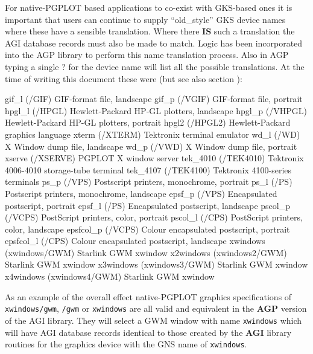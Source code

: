 \documentclass[twoside,11pt,nolof]{starlink}
\begin{document}
For native-PGPLOT based applications to co-exist with GKS-based ones
it is important that users can continue to supply ``old\_style'' GKS device
names where these have a sensible translation. Where there \textbf{IS} such
a translation the AGI  database records must also be made to match.
Logic has been incorporated into the AGP library to perform this name
translation process.
Also in AGP typing a single ? for the device name will list all the possible
translations. At the time of writing this document these were (but see also
section ):
\begin{terminalv}
gif_l     (/GIF)           GIF-format file, landscape
gif_p     (/VGIF)          GIF-format file, portrait
hpgl_l    (/HPGL)          Hewlett-Packard HP-GL plotters, landscape
hpgl_p    (/VHPGL)         Hewlett-Packard HP-GL plotters, portrait
hpgl2     (/HPGL2)         Hewlett-Packard graphics language
xterm     (/XTERM)         Tektronix terminal emulator
wd_l      (/WD)            X Window dump file, landscape
wd_p      (/VWD)           X Window dump file, portrait
xserve    (/XSERVE)        PGPLOT X window server
tek_4010  (/TEK4010)       Tektronix 4006-4010 storage-tube terminal
tek_4107  (/TEK4100)       Tektronix 4100-series terminals
ps_p      (/VPS)           Postscript printers, monochrome, portrait
ps_l      (/PS)            Postscript printers, monochrome, landscape
epsf_p    (/VPS)           Encapsulated postscript, portrait
epsf_l    (/PS)            Encapsulated postscript, landscape
pscol_p   (/VCPS)          PostScript printers, color, portrait
pscol_l   (/CPS)           PostScript printers, color, landscape
epsfcol_p (/VCPS)          Colour encapsulated postscript, portrait
epsfcol_l (/CPS)           Colour encapsulated postscript, landscape
xwindows  (xwindows/GWM)   Starlink GWM xwindow
x2windows (xwindows2/GWM)  Starlink GWM xwindow
x3windows (xwindows3/GWM)  Starlink GWM xwindow
x4windows (xwindows4/GWM)  Starlink GWM xwindow
\end{terminalv}

As an example of the overall effect native-PGPLOT graphics
specifications of \texttt{xwindows/gwm}, \texttt{\//gwm} or \texttt{xwindows}
are all valid and equivalent in the \textbf{AGP} version of the AGI
library. They will select a GWM window with name \texttt{xwindows} which
will have AGI database records identical to those created by the
\textbf{AGI} library routines for the graphics device with the GNS name of
\texttt{xwindows}.
\end{document}
